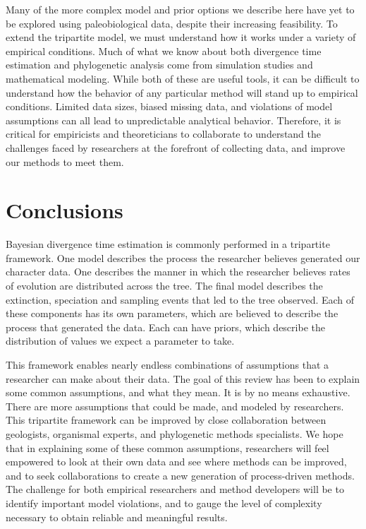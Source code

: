 \documentclass[11pt]{article}
\begin{document}
Many of the more complex model and prior options we describe here have yet to be explored using paleobiological data, despite their increasing feasibility.
To extend the tripartite model, we must understand how it works under a variety of empirical conditions.
Much of what we know about both divergence time estimation and phylogenetic analysis come from simulation studies and mathematical modeling.
While both of these are useful tools, it can be difficult to understand how the behavior of any particular method will stand up to empirical conditions.
Limited data sizes, biased missing data, and violations of model assumptions can all lead to unpredictable analytical behavior.
Therefore, it is critical for %
empiricists and theoreticians to collaborate to understand the challenges faced by researchers at the forefront of collecting data, and improve our methods to meet them.

\section{Conclusions}

Bayesian divergence time estimation is commonly performed in a tripartite framework.
One model describes the process the researcher believes generated our character data.
One describes the manner in which the researcher believes rates of evolution are distributed across the tree.
The final model describes the extinction, speciation and sampling events that led to the tree observed.
Each of these components has its own parameters, which are believed to describe the process that generated the data.
Each can have priors, which describe the distribution of values we expect a parameter to take.


This framework enables nearly endless combinations of assumptions that a researcher can make about their data.
The goal of this review has been to explain some common assumptions, and what they mean. 
It is by no means exhaustive.
There are more assumptions that could be made, and modeled by researchers.
This %
tripartite framework can be improved by close collaboration between geologists, organismal experts, and phylogenetic methods specialists. 
We hope that in explaining some of these common assumptions, researchers will feel empowered to look at their own data and see where methods can be improved, and to seek collaborations to create a new generation of process-driven methods. The challenge for both empirical researchers and method developers will be to identify important model violations, and to gauge the level of complexity necessary to obtain reliable and meaningful results.
\end{document}
